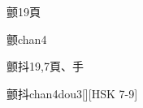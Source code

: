 \begin{Entry}{颤}{19}{⾴}
  \begin{Phonetics}{颤}{chan4}
  \end{Phonetics}
\end{Entry}

\begin{Entry}{颤抖}{19,7}{⾴、⼿}
  \begin{Phonetics}{颤抖}{chan4dou3}[][HSK 7-9]
  \end{Phonetics}
\end{Entry}


